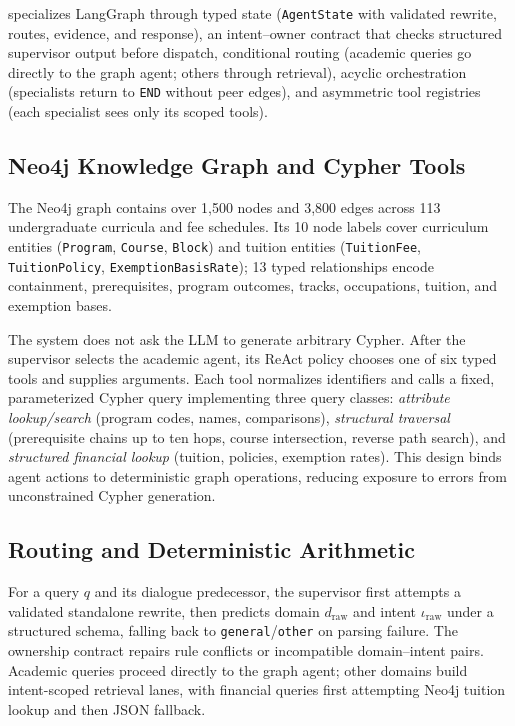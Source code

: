 \system{} specializes LangGraph through typed state (\texttt{AgentState} with validated rewrite, routes, evidence, and response), an intent--owner contract that checks structured supervisor output before dispatch, conditional routing (academic queries go directly to the graph agent; others through retrieval), acyclic orchestration (specialists return to \texttt{END} without peer edges), and asymmetric tool registries (each specialist sees only its scoped tools).

\subsection{Neo4j Knowledge Graph and Cypher Tools}
\label{sec:neo4j_graph}

The Neo4j graph contains over 1,500 nodes and 3,800 edges across 113 undergraduate curricula and fee schedules. Its 10 node labels cover curriculum entities (\texttt{Program}, \texttt{Course}, \texttt{Block}) and tuition entities (\texttt{TuitionFee}, \texttt{TuitionPolicy}, \texttt{ExemptionBasisRate}); 13 typed relationships encode containment, prerequisites, program outcomes, tracks, occupations, tuition, and exemption bases.

The system does not ask the LLM to generate arbitrary Cypher. After the supervisor selects the academic agent, its ReAct policy chooses one of six typed tools and supplies arguments. Each tool normalizes identifiers and calls a fixed, parameterized Cypher query implementing three query classes: \emph{attribute lookup/search} (program codes, names, comparisons), \emph{structural traversal} (prerequisite chains up to ten hops, course intersection, reverse path search), and \emph{structured financial lookup} (tuition, policies, exemption rates). This design binds agent actions to deterministic graph operations, reducing exposure to errors from unconstrained Cypher generation.

\subsection{Routing and Deterministic Arithmetic}
\label{sec:algorithms}

For a query $q$ and its dialogue predecessor, the supervisor first attempts a validated standalone rewrite, then predicts domain $d_{\mathrm{raw}}$ and intent $\iota_{\mathrm{raw}}$ under a structured schema, falling back to \texttt{general}/\texttt{other} on parsing failure. The ownership contract repairs rule conflicts or incompatible domain--intent pairs. Academic queries proceed directly to the graph agent; other domains build intent-scoped retrieval lanes, with financial queries first attempting Neo4j tuition lookup and then JSON fallback.

